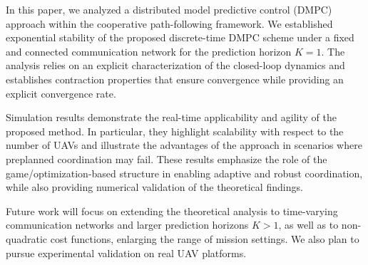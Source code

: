 \documentclass[letterpaper,journal]{IEEEtran}
\begin{document}
In this paper, we analyzed a distributed model predictive control (DMPC) approach within the cooperative path-following framework.
We established exponential stability of the proposed discrete-time DMPC scheme under a fixed and connected communication network for the prediction horizon $K=1$. The analysis relies on an explicit characterization of the closed-loop dynamics and establishes contraction properties that ensure convergence while providing an explicit convergence rate.

Simulation results demonstrate the real-time applicability and agility of the proposed method. In particular, they highlight scalability with respect to the number of UAVs and illustrate the advantages of the approach in scenarios where preplanned coordination may fail. These results emphasize the role of the game/optimization-based structure in enabling adaptive and robust coordination, while also providing numerical validation of the theoretical findings.

Future work will focus on extending the theoretical analysis to time-varying communication networks and larger prediction horizons $K>1$, as well as to non-quadratic cost functions,  enlarging the range of mission settings. We also plan to pursue experimental validation on real UAV platforms.



\end{document}
